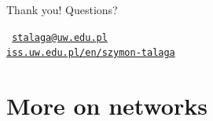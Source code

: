 \documentclass[
    hyperref={colorlinks,linkcolor=blue,urlcolor=blue,citecolor=blue}
]{beamer}
\begin{document}
{%
\begin{frame}{Thank you! Questions?}
\hfill
\begin{minipage}{.65\textwidth}
    \vspace{14.4em}
    \begin{tcolorbox}[
        width=1.1\textwidth,
        colback=black!5,
        title=\textbf{Contact}
    ]
    \texttt{\scriptsize{
        \hspace{-1.2em}
        \enspace
        \textcolor{blue}{\href{mailto:stalaga@uw.edu.pl}{stalaga@uw.edu.pl}} \\
        \href{http://iss.uw.edu.pl/en/szymon-talaga/}{iss.uw.edu.pl/en/szymon-talaga}
    }}
    \end{tcolorbox}
\end{minipage}
\end{frame}
}%


\section{More on networks}
\end{document}
